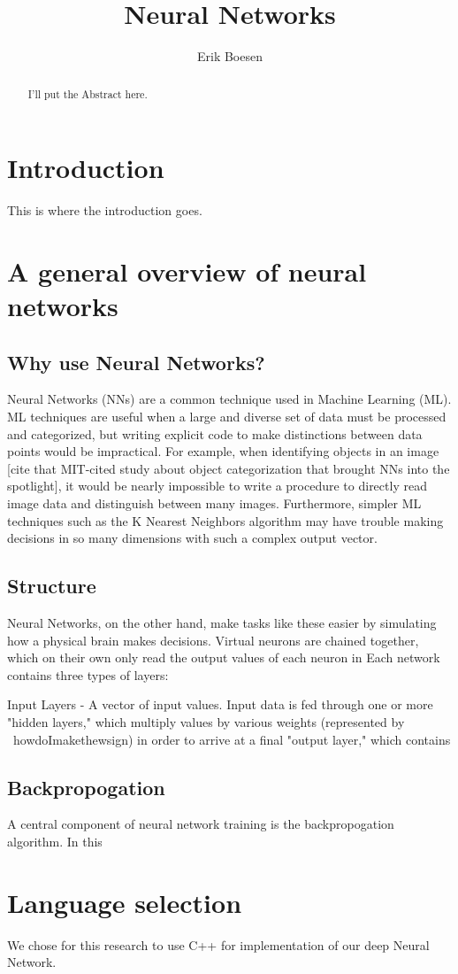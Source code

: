 \documentclass{article}
\begin{document}
\title{Neural Networks}
\author{Erik Boesen}

\maketitle

\begin{abstract}
I'll put the Abstract here.
\end{abstract}

\section{Introduction}
This is where the introduction goes.

\section{A general overview of neural networks}
\subsection{Why use Neural Networks?}
Neural Networks (NNs) are a common technique used in Machine Learning (ML). ML techniques are useful when a large and diverse set of data must be processed and categorized, but writing explicit code to make distinctions between data points would be impractical. For example, when identifying objects in an image [cite that MIT-cited study about object categorization that brought NNs into the spotlight], it would be nearly impossible to write a procedure to directly read image data and distinguish between many images. Furthermore, simpler ML  techniques such as the K Nearest Neighbors algorithm may have trouble making decisions in so many dimensions with such a complex output vector.

\subsection{Structure}
Neural Networks, on the other hand, make tasks like these easier by simulating how a physical brain makes decisions. Virtual neurons are chained together, which on their own only read the output values of each neuron in  Each network contains three types of layers:
\list
\item{Input Layers} - A vector of input values. Input data is fed through one or more "hidden layers," which multiply values by various weights (represented by \ howdoImakethewsign) in order to arrive at a final "output layer," which contains 

\subsection{Backpropogation}
A central component of neural network training is the backpropogation algorithm. In this 

\section{Language selection}
We chose for this research to use C++ for implementation of our deep Neural Network.
\end{document}
